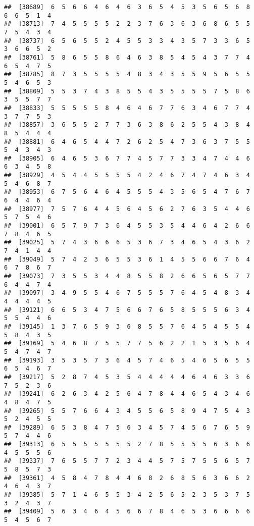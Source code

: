 \documentclass[
]{book}
\begin{document}
\begin{verbatim}
##  [38689]  6  5  6  6  4  6  4  6  3  6  5  4  5  3  5  6  5  6  8  6  6  5  1  4
##  [38713]  7  4  5  5  5  5  2  2  3  7  6  3  6  3  6  8  6  5  5  7  5  4  3  4
##  [38737]  6  5  6  5  5  2  4  5  5  3  3  4  3  5  7  3  3  6  5  3  6  6  5  2
##  [38761]  5  8  6  5  5  8  6  4  6  3  8  5  4  5  4  3  7  7  4  6  5  4  7  5
##  [38785]  8  7  3  5  5  5  5  4  8  3  4  3  5  5  9  5  6  5  5  5  4  6  5  3
##  [38809]  5  5  3  7  4  3  8  5  5  4  3  5  5  5  5  7  5  8  6  3  5  5  7  7
##  [38833]  5  5  5  5  5  8  4  6  4  6  7  7  6  3  4  6  7  7  4  3  7  7  5  3
##  [38857]  3  6  5  5  2  7  7  3  6  3  8  6  2  5  5  4  3  8  4  8  5  4  4  4
##  [38881]  6  4  6  5  4  4  7  2  6  2  5  4  7  3  6  3  7  5  5  5  4  3  4  3
##  [38905]  6  4  6  5  3  6  7  7  4  5  7  7  3  3  4  7  4  4  6  6  3  4  5  8
##  [38929]  4  5  4  4  5  5  5  5  4  2  4  6  7  4  7  4  6  3  4  5  4  6  8  7
##  [38953]  6  7  5  6  4  6  4  5  5  5  4  3  5  6  5  4  7  6  7  6  4  4  6  4
##  [38977]  7  5  7  6  4  4  5  6  4  5  6  2  7  6  3  5  4  4  6  5  7  5  4  6
##  [39001]  6  5  7  9  7  3  6  4  5  5  3  5  4  4  6  4  2  6  6  7  8  4  6  5
##  [39025]  5  7  4  3  6  6  6  5  3  6  7  3  4  6  5  4  3  6  2  7  4  1  4  4
##  [39049]  5  7  4  2  3  6  5  5  3  6  1  4  5  5  6  6  7  6  4  6  7  8  6  7
##  [39073]  7  3  5  5  3  4  4  8  5  5  8  2  6  6  5  6  5  7  7  6  4  4  7  4
##  [39097]  3  4  9  5  5  4  6  7  5  5  5  7  6  4  5  4  8  3  4  4  4  4  4  5
##  [39121]  6  6  5  3  4  7  5  6  6  7  6  5  8  5  5  5  6  3  4  5  5  4  4  6
##  [39145]  1  3  7  6  5  9  3  6  8  5  5  7  6  4  5  4  5  5  4  5  8  4  3  5
##  [39169]  5  4  6  8  7  5  5  7  7  5  6  2  2  1  5  3  5  6  4  5  4  7  4  7
##  [39193]  3  5  3  5  7  3  6  4  5  7  4  6  5  4  6  5  6  5  5  6  5  4  6  7
##  [39217]  5  2  8  7  4  5  3  5  4  4  4  4  4  6  4  6  3  3  6  7  5  2  3  6
##  [39241]  6  2  6  3  4  2  5  6  4  7  8  4  4  6  5  4  3  4  6  4  8  4  7  5
##  [39265]  5  5  7  6  6  4  3  4  5  5  6  5  8  9  4  7  5  4  3  5  2  4  5  5
##  [39289]  6  5  3  8  4  7  5  6  3  4  5  7  4  5  6  7  6  5  9  5  7  4  4  6
##  [39313]  6  5  5  5  5  5  5  5  2  7  8  5  5  5  5  6  3  6  6  4  5  5  5  6
##  [39337]  7  6  5  5  7  7  2  3  4  4  5  7  5  7  5  5  6  5  7  5  8  5  7  3
##  [39361]  4  5  8  4  7  8  4  4  6  8  2  6  8  5  6  3  6  6  2  4  6  4  3  7
##  [39385]  5  7  1  4  6  5  5  3  4  2  5  6  5  2  3  5  3  7  5  3  2  4  3  7
##  [39409]  5  6  3  4  6  4  5  6  6  7  8  4  6  5  3  6  6  6  6  5  4  5  6  7

\end{verbatim}
\end{document}
